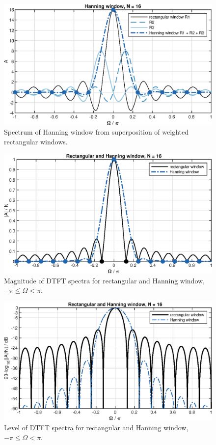 \documentclass[11pt,a4paper,DIV=12]{scrartcl}
\begin{document}
\begin{figure}
		\centering
		\includegraphics[]{graphics/HanningausRectWindow}
		\caption{Spectrum of Hanning window from superposition of weighted rectangular windows.}
		\label{HanningausRectWindow}
\end{figure}
\begin{figure}
		\centering
		\includegraphics[]{graphics/DTFTHanningWin_lin}
		\caption{Magnitude of DTFT spectra for rectangular and Hanning window, $-\pi\leq\Omega<\pi$.}
		\label{DTFTHanningWin_lin}
\end{figure}
\begin{figure}
		\centering
		\includegraphics[]{graphics/DTFTHanningWin_log}
		\caption{Level of DTFT spectra for rectangular and Hanning window, $-\pi\leq\Omega<\pi$.}
		\label{DTFTHanningWin_log}
\end{figure}
\end{document}
